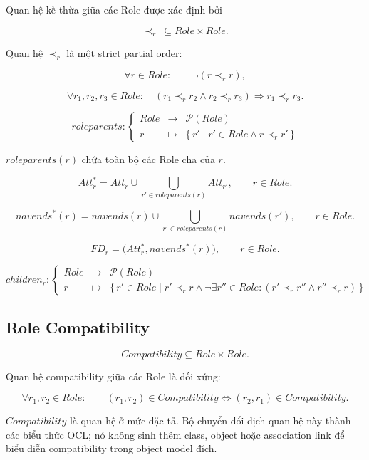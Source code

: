 \documentclass[12pt,a4paper]{article}
\theoremstyle{definition}
\begin{document}
Quan hệ kế thừa giữa các Role được xác định bởi

\[
\prec_r\ \subseteq Role\times Role.
\tag{WF-10}
\]

Quan hệ $\prec_r$ là một strict partial order:

\[
\forall r\in Role:
\qquad
\neg(r\prec_r r),
\]

\[
\forall r_1,r_2,r_3\in Role:
\quad
(r_1\prec_r r_2\land r_2\prec_r r_3)
\Rightarrow
r_1\prec_r r_3.
\]

\[
roleparents:
\left\{
\begin{array}{rcl}
Role & \to & \mathcal{P}(Role)\\
r & \mapsto &
\{\,r'\mid r'\in Role\land r\prec_r r'\,\}
\end{array}
\right.
\]

$roleparents(r)$ chứa toàn bộ các Role cha của $r$.

\[
Att_r^{*}
=
Att_r
\cup
\bigcup_{r'\in roleparents(r)}
Att_{r'},
\qquad
r\in Role.
\]

\[
navends^{*}(r)
=
navends(r)
\cup
\bigcup_{r'\in roleparents(r)}
navends(r'),
\qquad
r\in Role.
\]

\[
FD_r
=
\bigl(
Att_r^{*},
navends^{*}(r)
\bigr),
\qquad
r\in Role.
\]

\[
children_r:
\left\{
\begin{array}{rcl}
Role & \to & \mathcal{P}(Role)\\
r & \mapsto &
\{\,r'\in Role
\mid
r'\prec_r r
\land
\neg\exists r''\in Role:
(r'\prec_r r''\land r''\prec_r r)
\,\}
\end{array}
\right.
\]


\subsection{Role Compatibility}

\[
Compatibility\subseteq Role\times Role.
\]

Quan hệ compatibility giữa các Role là đối xứng:

\[
\forall r_1,r_2\in Role:
\qquad
(r_1,r_2)\in Compatibility
\Longleftrightarrow
(r_2,r_1)\in Compatibility.
\]

$Compatibility$ là quan hệ ở mức đặc tả. Bộ chuyển đổi dịch quan hệ này
thành các biểu thức OCL; nó không sinh thêm class, object hoặc association
link để biểu diễn compatibility trong object model đích.
\end{document}
